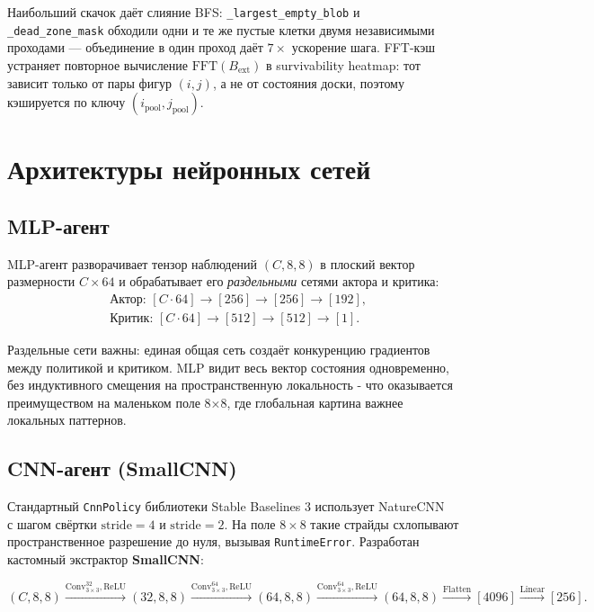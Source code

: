 \documentclass[12pt, a4paper]{article}
\begin{document}
Наибольший скачок даёт слияние BFS: \texttt{\_largest\_empty\_blob} и \texttt{\_dead\_zone\_mask} обходили одни и те же пустые клетки двумя независимыми проходами --- объединение в один проход даёт $7\times$ ускорение шага. FFT-кэш устраняет повторное вычисление $\mathrm{FFT}(B_\text{ext})$ в survivability heatmap: тот зависит только от пары фигур $(i, j)$, а не от состояния доски, поэтому кэшируется по ключу $(i_{\text{pool}}, j_{\text{pool}})$.

\section{Архитектуры нейронных сетей}

\subsection{MLP-агент}

MLP-агент разворачивает тензор наблюдений $(C, 8, 8)$ в плоский вектор размерности $C \times 64$ и обрабатывает его \textit{раздельными} сетями актора и критика:
\begin{align}
  &\text{Актор: } [C\cdot 64] \to [256] \to [256] \to [192], \\
  &\text{Критик: } [C\cdot 64] \to [512] \to [512] \to [1].
\end{align}

Раздельные сети важны: единая общая сеть создаёт конкуренцию градиентов между политикой и критиком. MLP видит весь вектор состояния одновременно, без индуктивного смещения на пространственную локальность - что оказывается преимуществом на маленьком поле 8×8, где глобальная картина важнее локальных паттернов.

\subsection{CNN-агент (SmallCNN)}

Стандартный \texttt{CnnPolicy} библиотеки Stable Baselines 3 использует NatureCNN~\cite{mnih2015} с шагом свёртки $\mathrm{stride}=4$ и $\mathrm{stride}=2$. На поле $8 \times 8$ такие страйды схлопывают пространственное разрешение до нуля, вызывая \texttt{RuntimeError}. Разработан кастомный экстрактор \textbf{SmallCNN}:

\begin{equation}
  (C, 8, 8)
  \xrightarrow{\text{Conv}_{3\times3}^{32}, \text{ReLU}}
  (32, 8, 8)
  \xrightarrow{\text{Conv}_{3\times3}^{64}, \text{ReLU}}
  (64, 8, 8)
  \xrightarrow{\text{Conv}_{3\times3}^{64}, \text{ReLU}}
  (64, 8, 8)
  \xrightarrow{\text{Flatten}}
  [4096]
  \xrightarrow{\text{Linear}}
  [256].
\end{equation}
\end{document}
